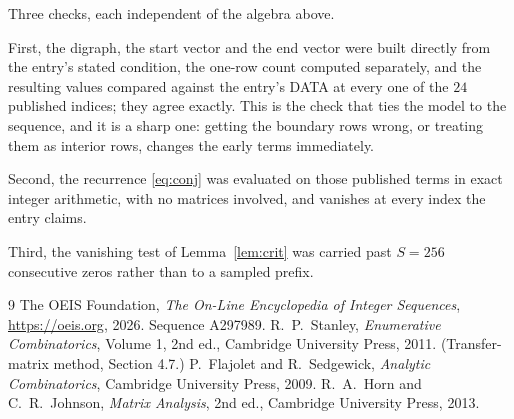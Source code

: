 \documentclass[11pt,a4paper]{article}
\theoremstyle{plain}
\theoremstyle{definition}
\begin{document}
Three checks, each independent of the algebra above.

First, the digraph, the start vector and the end vector were built directly from the
entry's stated condition, the one-row count computed separately, and the resulting values
compared against the entry's DATA at every one of the $24$ published indices; they
agree exactly. This is the check that ties the model to the sequence, and it is a sharp one:
getting the boundary rows wrong, or treating them as interior rows, changes the early terms
immediately.

Second, the recurrence \eqref{eq:conj} was evaluated on those published terms in exact
integer arithmetic, with no matrices involved, and vanishes at every index the entry claims.

Third, the vanishing test of Lemma~\ref{lem:crit} was carried past $S=256$ consecutive
zeros rather than to a sampled prefix.

\begin{thebibliography}{9}
 The OEIS Foundation, \emph{The On-Line Encyclopedia of Integer
Sequences}, \url{https://oeis.org}, 2026. Sequence A297989.
 R.~P.~Stanley, \emph{Enumerative Combinatorics}, Volume 1, 2nd ed.,
Cambridge University Press, 2011. (Transfer-matrix method, Section 4.7.)
 P.~Flajolet and R.~Sedgewick, \emph{Analytic Combinatorics}, Cambridge
University Press, 2009.
 R.~A.~Horn and C.~R.~Johnson, \emph{Matrix Analysis}, 2nd ed., Cambridge
University Press, 2013.
\end{thebibliography}
\end{document}
